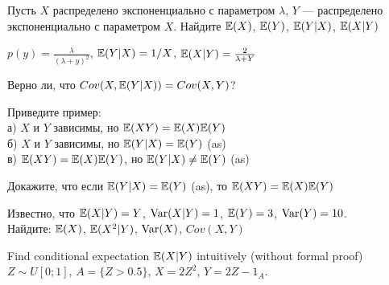 \begin{problem}
Пусть $X$ распределено экспоненциально с параметром $\lambda$, $Y$ — распределено экспоненциально с параметром $X$. Найдите $\mathbb{E}(X)$, $\mathbb{E}(Y)$, $\mathbb{E}(Y|X)$, $\mathbb{E}(X|Y)$

\begin{sol}
 $p(y)=\frac{\lambda}{(\lambda+y)^{2}}$, $\mathbb{E}(Y|X)=1/X$, $\mathbb{E}(X|Y)=\frac{2}{\lambda+Y}$
\end{sol}
\end{problem}

\begin{problem}
Верно ли, что $Cov(X,\mathbb{E}(Y|X))=Cov(X,Y)$?

\begin{sol}

\end{sol}
\end{problem}

\begin{problem}
Приведите пример: \\
а) $X$ и $Y$ зависимы, но $\mathbb{E}(XY)=\mathbb{E}(X)\mathbb{E}(Y)$ \\
б) $X$ и $Y$ зависимы, но $\mathbb{E}(Y|X)=\mathbb{E}(Y)$ (as) \\
в) $\mathbb{E}(XY)=\mathbb{E}(X)\mathbb{E}(Y)$, но $\mathbb{E}(Y|X)\neq \mathbb{E}(Y)$ (as)

\begin{sol}

\end{sol}
\end{problem}

\begin{problem}
Докажите, что если $\mathbb{E}(Y|X)=\mathbb{E}(Y)$ (as), то $\mathbb{E}(XY)=\mathbb{E}(X)\mathbb{E}(Y)$

\begin{sol}

\end{sol}
\end{problem}

\begin{problem}
Известно, что $\mathbb{E}(X|Y)=Y$, $\operatorname{Var}(X|Y)=1$, $\mathbb{E}(Y)=3$, $\operatorname{Var}(Y)=10$. \\
Найдите: $\mathbb{E}(X)$, $\mathbb{E}(X^{2}|Y)$, $\operatorname{Var}(X)$, $Cov(X,Y)$

\begin{sol}

\end{sol}
\end{problem}

\begin{problem}
Find conditional expectation $\mathbb{E}(X|Y)$ intuitively (without formal proof)  \\
$Z\sim U[0;1]$, $A=\{Z>0.5\}$, $X=2Z^{2}$, $Y=2Z-1_{A}$.

\begin{sol}

\end{sol}
\end{problem}

